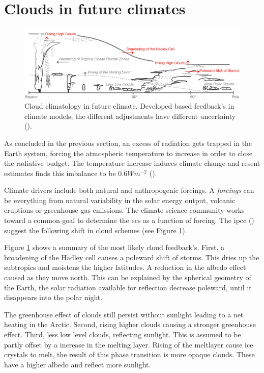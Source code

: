 \section{Clouds in future climates} \label{sec:intro_cloud_future_climates}
\begin{figure}[h]
    \centering
    \includegraphics[scale = 0.8]{Chapter1_Intro/images/Fig7-11_ipcc.jpg}
    \caption{Cloud climatology in future climate. Developed based feedback's in climate models, the different adjustments have different uncertainty (\cite{IPCC_CH7_clouds}).}
    \label{fig:cloud_scheme}
\end{figure}
As concluded in the previous section, an excess of radiation gets trapped in the Earth system, forcing the atmospheric temperature to increase in order to close the radiative budget. The temperature increase induces climate change and resent estimates finds this imbalance to be $0.6 Wm^{-2}$ (\cite{Wild2019TheModels}).

Climate drivers include both natural and anthropogenic forcings. A \textit{forcings} can be everything from natural variability in the solar energy output, volcanic eruptions or greenhouse gas emissions. The climate science community works toward a common goal to determine the \acrshort{ecs} as a function of forcing. %
The \acrshort{ipcc} (\cite{IPCC_CH7_clouds}) suggest the following shift in cloud schemes (see Figure \ref{fig:cloud_scheme}). 

Figure \ref{fig:cloud_scheme} shows a summary of the most likely cloud feedback's. First, a broadening of the Hadley cell causes a poleward shift of storms. This dries up the subtropics and moistens the higher latitudes. A reduction in the albedo effect caused as they move north. This can be explained by the spherical geometry of the Earth, the solar radiation available for reflection decrease poleward, until it disappears into the polar night. 

The greenhouse effect of clouds still persist without sunlight leading to a net heating in the Arctic. Second, rising higher clouds causing a stronger greenhouse effect. Third, less low level clouds, reflecting sunlight. This is assumed to be partly offset by a increase in the melting layer. Rising of the meltlayer cause ice crystals to melt, the result of this phase transition is more opaque clouds. These have a higher albedo and reflect more sunlight. 